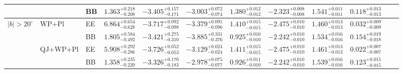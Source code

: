 \begin{table}[h]
\begin{adjustbox}{center}
{\begin{tabular}{llllcccccccc}
 &          & BB & $1.363^{+0.218}_{-0.208}$ & $-3.405^{+0.157}_{-0.171}$ & $-3.003^{+0.072}_{-0.074}$ & $1.380^{+0.012}_{-0.012}$ & $-2.323^{+0.008}_{-0.008}$ & $1.541^{+0.011}_{-0.011}$ & $0.118^{+0.013}_{-0.013}$ \\
\midrule
\multirow{4}{*}{$|b|>20^\circ$}
 & WP+Pl    & EE & $6.864^{+0.654}_{-0.628}$ & $-3.717^{+0.092}_{-0.098}$ & $-3.379^{+0.091}_{-0.096}$ & $1.410^{+0.015}_{-0.015}$ & $-2.475^{+0.010}_{-0.010}$ & $1.460^{+0.013}_{-0.013}$ & $0.032^{+0.009}_{-0.009}$ \\
 &          & BB & $1.805^{+0.584}_{-0.492}$ & $-3.421^{+0.275}_{-0.310}$ & $-3.885^{+0.331}_{-0.376}$ & $0.925^{+0.010}_{-0.010}$ & $-2.242^{+0.010}_{-0.010}$ & $1.534^{+0.016}_{-0.016}$ & $0.154^{+0.019}_{-0.018}$ \\
 & QJ+WP+Pl & EE & $5.908^{+0.292}_{-0.286}$ & $-3.726^{+0.052}_{-0.053}$ & $-3.129^{+0.024}_{-0.024}$ & $1.411^{+0.015}_{-0.015}$ & $-2.475^{+0.010}_{-0.010}$ & $1.461^{+0.013}_{-0.013}$ & $0.022^{+0.007}_{-0.007}$ \\
 &          & BB & $1.358^{+0.235}_{-0.220}$ & $-3.326^{+0.170}_{-0.183}$ & $-2.978^{+0.075}_{-0.077}$ & $0.926^{+0.011}_{-0.010}$ & $-2.242^{+0.010}_{-0.010}$ & $1.539^{+0.016}_{-0.016}$ & $0.123^{+0.015}_{-0.015}$ \\
\bottomrule
\end{tabular}}
\end{adjustbox}
\end{table}